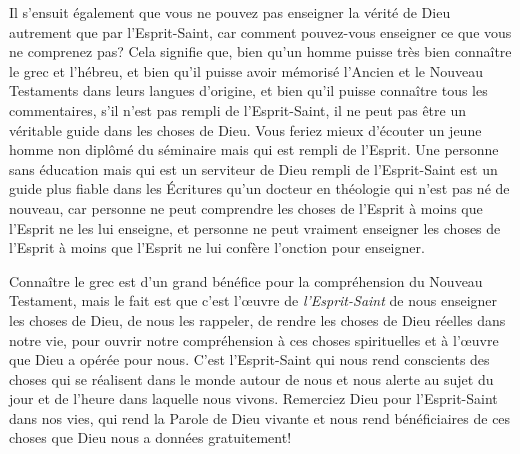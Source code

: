 Il s'ensuit également que vous ne pouvez pas enseigner
 la vérité de Dieu autrement que par l'Esprit-Saint,
 car comment pouvez-vous enseigner ce que vous ne comprenez pas?
 Cela signifie que, bien qu'un homme puisse très bien connaître le grec et l'hébreu,
 et bien qu'il puisse avoir mémorisé l'Ancien
 et le Nouveau Testaments dans leurs langues d'origine,
 et bien qu'il puisse connaître tous les commentaires,
 s'il n'est pas rempli de l'Esprit-Saint,
 il ne peut pas être un véritable guide dans les choses de Dieu.
 Vous feriez mieux d'écouter un jeune homme non diplômé
 du séminaire mais qui est rempli de l'Esprit.
 Une personne sans éducation mais qui est un serviteur de Dieu
 rempli de l'Esprit-Saint est un guide plus fiable
 dans les Écritures qu'un docteur en théologie
 qui n'est pas né de nouveau,
 car personne ne peut comprendre les choses de l'Esprit
 à moins que l'Esprit ne les lui enseigne,
 et personne ne peut vraiment enseigner les choses de l'Esprit
 à moins que l'Esprit ne lui confère l'onction pour enseigner.

Connaître le grec est d'un grand bénéfice pour la compréhension
 du Nouveau Testament, mais le fait est que c'est l'œuvre
 de \emph{l'Esprit-Saint} de nous enseigner les choses de Dieu,
 de nous les rappeler, de rendre les choses de Dieu réelles
 dans notre vie, pour ouvrir notre compréhension
 à ces choses spirituelles et à l'œuvre que Dieu a opérée pour nous.
 C'est l'Esprit-Saint qui nous rend conscients des choses
 qui se réalisent dans le monde autour de nous et nous alerte
 au sujet du jour et de l'heure dans laquelle nous vivons.
 Remerciez Dieu pour l'Esprit-Saint dans nos vies,
 qui rend la Parole de Dieu vivante et nous rend bénéficiaires
 de ces choses que Dieu nous a données gratuitement!
\closechapter


